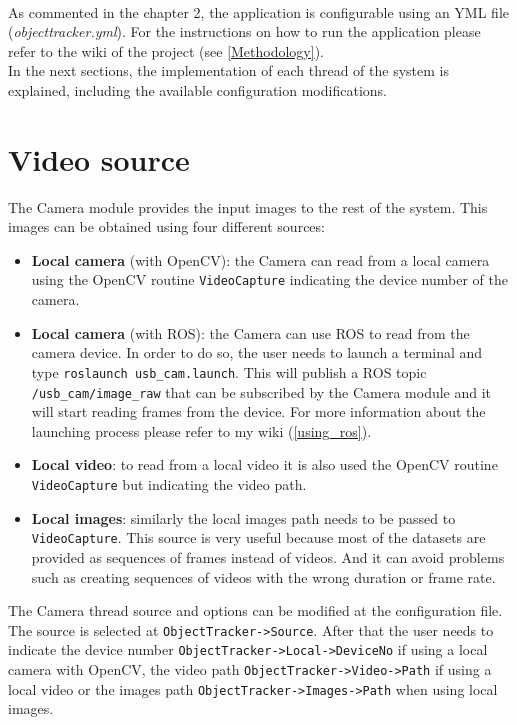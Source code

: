 \\
As commented in the chapter 2, the application is configurable using an YML file (\textit{objecttracker.yml}). For the instructions on how to run the application please refer to the wiki of the project (see \ref{Methodology}).
\\In the next sections, the implementation of each thread of the system is explained, including the available configuration modifications.\\

\section{Video source}
The Camera module provides the input images to the rest of the system. This images can be obtained using four different sources:
\begin{itemize}
    \item \textbf{Local camera} (with OpenCV): the Camera can read from a local camera using the OpenCV routine \texttt{VideoCapture} indicating the device number of the camera.
    \item \textbf{Local camera} (with ROS): the Camera can use ROS to read from the camera device. In order to do so, the user needs to launch a terminal and type \texttt{roslaunch usb\_cam.launch}. This will publish a ROS topic \texttt{/usb\_cam/image\_raw} that can be subscribed by the Camera module and it will start reading frames from the device. For more information about the launching process please refer to my wiki (\ref{using_ros}).
    \item \textbf{Local video}: to read from a local video it is also used the OpenCV routine \texttt{VideoCapture} but indicating the video path.
\item \textbf{Local images}: similarly the local images path needs to be passed to \texttt{VideoCapture}. This source is very useful because most of the datasets are provided as sequences of frames instead of videos. And it can avoid problems such as creating sequences of videos with the wrong duration or frame rate.
\end{itemize}
The Camera thread source and options can be modified at the configuration file. The source is selected at \texttt{ObjectTracker->Source}. After that the user needs to indicate the device number \texttt{ObjectTracker->Local->DeviceNo} if using a local camera with OpenCV, the video path \texttt{ObjectTracker->Video->Path} if using a local video or the images path \texttt{ObjectTracker->Images->Path} when using local images.\\
